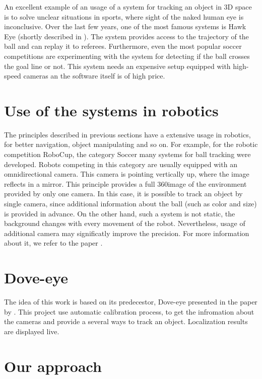 An excellent example of an usage of a system for tracking an object in 3D space
is to solve unclear situations in sports, where sight of the naked human
eye is inconclusive. Over the last few years, one of the most famous systems is
Hawk Eye (shortly described in \citet*{owens2003hawk}). The system provides
access to the trajectory of the ball and can replay it to referees.
Furthermore, even the most popular soccer competitions are experimenting with
the system for detecting if the ball crosses the goal line or not.  This system needs
an expensive setup equipped with high-speed cameras an the software itself is of
high price.

\section{Use of the systems in robotics}

The principles described in previous sections have a extensive usage in
robotics, for better navigation, object manipulating and so on. For example,
for the robotic competition
RoboCup, the category Soccer many systems for ball tracking were developed. Robots
competing in this category are usually equipped with an omnidirectional camera.
This camera is pointing vertically up, where the image reflects in a mirror.
This principle provides a full 360\degree image of the environment provided by
only one camera. In this case, it is possible to track an object by single
camera, since additional information about the ball (such as color and size)
is provided in advance. On the other hand, such a system is not static, the
background changes with every movement of the robot. Nevertheless, usage of
additional camera may significatly improve the precision. For more information
about it, we refer to the paper \citet*{kappeler20103d}.


\section{Dove-eye}

The idea of this work is based on its predecestor, Dove-eye presented in the
paper by \citet*{dove-eye}. This project use automatic calibration process, to
get the infromation about the cameras and provide a several ways to track an
object. Localization results are displayed live.

\section{Our approach}

